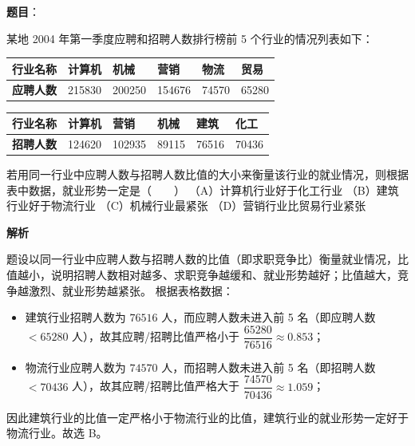 \begin{answer}

\textbf{题目}：

某地 2004 年第一季度应聘和招聘人数排行榜前 5 个行业的情况列表如下：

\begin{center}
\begin{tabular}{llllll}
\toprule
行业名称 & 计算机 & 机械 & 营销 & 物流 & 贸易 \\
\midrule
\textbf{应聘人数} & 215830 & 200250 & 154676 & 74570 & 65280 \\
\bottomrule
\end{tabular}
\end{center}

\begin{center}
\begin{tabular}{llllll}
\toprule
行业名称 & 计算机 & 营销 & 机械 & 建筑 & 化工 \\
\midrule
\textbf{招聘人数} & 124620 & 102935 & 89115 & 76516 & 70436 \\
\bottomrule
\end{tabular}
\end{center}

若用同一行业中应聘人数与招聘人数比值的大小来衡量该行业的就业情况，则根据表中数据，就业形势一定是\mbox{（　　）}
（A）计算机行业好于化工行业
（B）建筑行业好于物流行业
（C）机械行业最紧张
（D）营销行业比贸易行业紧张

\textbf{解析}

题设以同一行业中应聘人数与招聘人数的比值（即求职竞争比）衡量就业情况，比值越小，说明招聘人数相对越多、求职竞争越缓和、就业形势越好；比值越大，竞争越激烈、就业形势越紧张。
根据表格数据：
\begin{itemize}
\item 建筑行业招聘人数为 $76516$ 人，而应聘人数未进入前 5 名（即应聘人数 $< 65280$ 人），故其应聘/招聘比值严格小于 $\dfrac{65280}{76516} \approx 0.853$；
\item 物流行业应聘人数为 $74570$ 人，而招聘人数未进入前 5 名（即招聘人数 $< 70436$ 人），故其应聘/招聘比值严格大于 $\dfrac{74570}{70436} \approx 1.059$；
\end{itemize}
因此建筑行业的比值一定严格小于物流行业的比值，建筑行业的就业形势一定好于物流行业。故选 B。


\end{answer}
